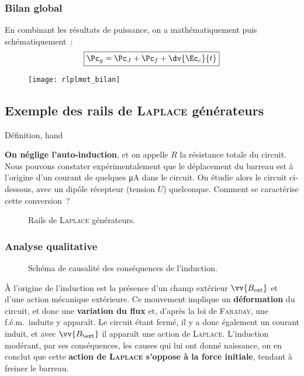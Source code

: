 \documentclass[../main/main.tex]{subfiles}
\begin{document}
\subsubsection{Bilan global}
\label{sssec:rlplmot_bilanglb}
En combinant les résultats de puissance, on a mathématiquement puis
schématiquement~:
\[
	\boxed{\Pc_g = \Pc_J + \Pc_f + \dv{\Ec_c}{t}}
\]
\begin{figure}[H]
	\centering
	\texttt{[image: rlplmot\_bilan]}
	\label{fig:rlplmot_bilan}
\end{figure}

\newpage

\subsection{Exemple des rails de \textsc{Laplace} générateurs}
\label{ssec:rlplgene}
\begin{tdefi}{Définition, hand}
\end{tdefi}
\textbf{On néglige l'auto-induction}, et on appelle $R$ la résistance totale du
circuit. Nous pouvons constater expérimentalement que le déplacement du barreau
est à l'origine d'un courant de quelques \si{\micro A} dans le circuit. On
étudie alors le circuit ci-dessous, avec un dipôle récepteur (tension $U$)
quelconque. Comment se caractérise cette conversion~?
\begin{figure}[h]
	\centering
	\caption{Rails de \textsc{Laplace} générateurs.}
	\label{fig:rlplgene_schema}
\end{figure}
\vspace*{-20pt}

\subsubsection{Analyse qualitative}
\label{ssec:rlplmot_anaqual}
\begin{figure}[h]
	\centering
	\caption{Schéma de causalité des conséquences de l'induction.}
	\label{fig:modlenz_rlplgene}
\end{figure}
À l'origine de l'induction est la présence
d'un champ extérieur $\vv{B_{\rm ext}}$ et d'une action mécanique extérieure. Ce
mouvement implique un \textbf{déformation} du circuit, et donc une
\textbf{variation du flux} et, d'après la loi de \textsc{Faraday}, une f.é.m.\
induite y apparaît. Le circuit étant fermé, il y a donc également un courant
induit, et avec $\vv{B_{\ext}}$ il apparaît une action de \textsc{Laplace}.
\smallbreak
L'induction modérant, par ses conséquences, les causes qui lui ont donné
naissance, on en conclut que cette \textbf{action de \textsc{Laplace} s'oppose à
	la force initiale}, tendant à freiner le barreau.
\end{document}
